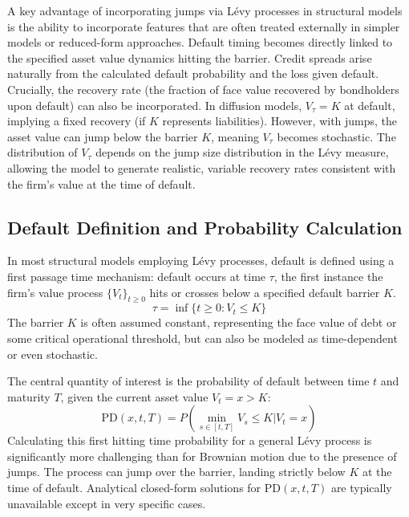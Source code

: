 \documentclass[11pt,twoside,openright]{report}
\begin{document}
A key advantage of incorporating jumps via Lévy processes in structural models is the ability to incorporate features that are often treated externally in simpler models or reduced-form approaches. Default timing becomes directly linked to the specified asset value dynamics hitting the barrier. Credit spreads arise naturally from the calculated default probability and the loss given default. Crucially, the recovery rate (the fraction of face value recovered by bondholders upon default) can also be incorporated. In diffusion models, $V_{\tau} = K$ at default, implying a fixed recovery (if $K$ represents liabilities). However, with jumps, the asset value can jump below the barrier $K$, meaning $V_{\tau}$ becomes stochastic. The distribution of $V_{\tau}$ depends on the jump size distribution in the Lévy measure, allowing the model to generate realistic, variable recovery rates consistent with the firm's value at the time of default.

\subsection{Default Definition and Probability Calculation}
\label{subsec:default_prob_calc}

In most structural models employing Lévy processes, default is defined using a first passage time mechanism: default occurs at time $\tau$, the first instance the firm's value process $\{V_t\}_{t \ge 0}$ hits or crosses below a specified default barrier $K$.
\[ \tau = \inf\{t \ge 0 : V_t \le K\} \]
The barrier $K$ is often assumed constant, representing the face value of debt or some critical operational threshold, but can also be modeled as time-dependent or even stochastic.

The central quantity of interest is the probability of default between time $t$ and maturity $T$, given the current asset value $V_t = x > K$:
\[ \text{PD}(x, t, T) = P(\min_{s \in [t,T]} V_s \le K | V_t = x) \]
Calculating this first hitting time probability for a general Lévy process is significantly more challenging than for Brownian motion due to the presence of jumps. The process can jump over the barrier, landing strictly below $K$ at the time of default. Analytical closed-form solutions for $\text{PD}(x, t, T)$ are typically unavailable except in very specific cases.
\end{document}
